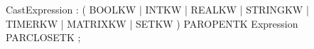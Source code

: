%
%
%
\begin{rail}
CastExpression : ( BOOLKW | INTKW | REALKW | STRINGKW
                 | TIMERKW | MATRIXKW | SETKW
                 )
                 PAROPENTK Expression PARCLOSETK
               ;
\end{rail}
